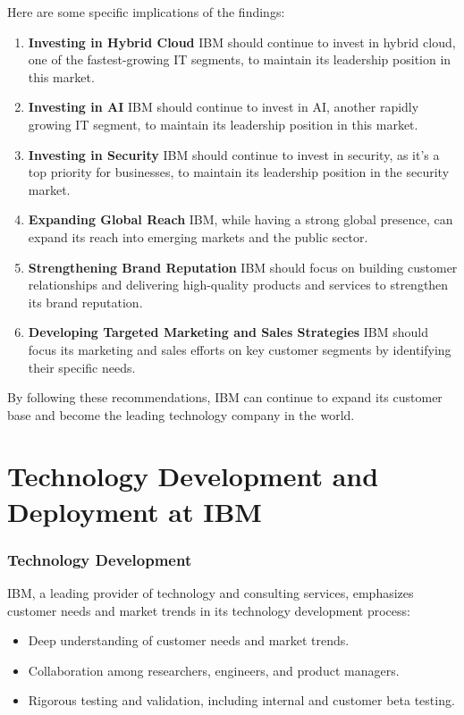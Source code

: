 Here are some specific implications of the findings:
\begin{enumerate}

\item \textbf{Investing in Hybrid Cloud}
IBM should continue to invest in hybrid cloud, one of the fastest-growing IT segments, to maintain its leadership position in this market.

\item \textbf{Investing in AI}
IBM should continue to invest in AI, another rapidly growing IT segment, to maintain its leadership position in this market.

\item \textbf{Investing in Security}
IBM should continue to invest in security, as it's a top priority for businesses, to maintain its leadership position in the security market.

\item \textbf{Expanding Global Reach}
IBM, while having a strong global presence, can expand its reach into emerging markets and the public sector.

\item \textbf{Strengthening Brand Reputation}
IBM should focus on building customer relationships and delivering high-quality products and services to strengthen its brand reputation.

\item \textbf{Developing Targeted Marketing and Sales Strategies}
IBM should focus its marketing and sales efforts on key customer segments by identifying their specific needs.
\end{enumerate}
By following these recommendations, IBM can continue to expand its customer base and become the leading technology company in the world.

\section{Technology Development and Deployment at IBM}
\subsubsection{Technology Development}

IBM, a leading provider of technology and consulting services, emphasizes customer needs and market trends in its technology development process:

\begin{itemize}
    \item Deep understanding of customer needs and market trends.
    \item Collaboration among researchers, engineers, and product managers.
    \item Rigorous testing and validation, including internal and customer beta testing.
\end{itemize}

